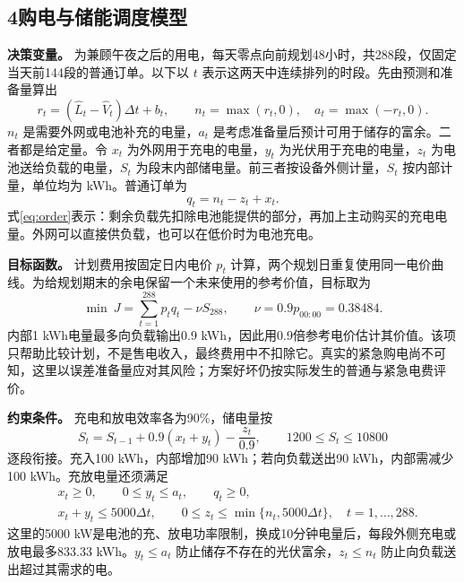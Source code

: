 \subsection*{4\quad 购电与储能调度模型}

\textbf{决策变量。} 为兼顾午夜之后的用电，每天零点向前规划48小时，共288段，仅固定当天前144段的普通订单。以下以 $t$ 表示这两天中连续排列的时段。先由预测和准备量算出
\begin{equation}
r_t=(\widehat L_t-\widehat V_t)\Delta t+b_t,\qquad
n_t=\max(r_t,0),\quad a_t=\max(-r_t,0).
\end{equation}
$n_t$ 是需要外网或电池补充的电量，$a_t$ 是考虑准备量后预计可用于储存的富余。二者都是给定量。令 $x_t$ 为外网用于充电的电量，$y_t$ 为光伏用于充电的电量，$z_t$ 为电池送给负载的电量，$S_t$ 为段末内部储电量。前三者按设备外侧计量，$S_t$ 按内部计量，单位均为 kWh。普通订单为
\begin{equation}
q_t=n_t-z_t+x_t.
\label{eq:order}
\end{equation}
式\eqref{eq:order}表示：剩余负载先扣除电池能提供的部分，再加上主动购买的充电电量。外网可以直接供负载，也可以在低价时为电池充电。

\textbf{目标函数。} 计划费用按固定日内电价 $p_t$ 计算，两个规划日重复使用同一电价曲线。为给规划期末的余电保留一个未来使用的参考价值，目标取为
\begin{equation}
\min\ J=\sum_{t=1}^{288}p_tq_t-\nu S_{288},\qquad
\nu=0.9p_{00:00}=0.38484.
\label{eq:objective}
\end{equation}
内部1 kWh电量最多向负载输出0.9 kWh，因此用0.9倍参考电价估计其价值。该项只帮助比较计划，不是售电收入，最终费用中不扣除它。真实的紧急购电尚不可知，这里以误差准备量应对其风险；方案好坏仍按实际发生的普通与紧急电费评价。

\textbf{约束条件。} 充电和放电效率各为90\%，储电量按
\begin{equation}
S_t=S_{t-1}+0.9(x_t+y_t)-\frac{z_t}{0.9},\qquad
1200\le S_t\le10800
\label{eq:storage}
\end{equation}
逐段衔接。充入100 kWh，内部增加90 kWh；若向负载送出90 kWh，内部需减少100 kWh。充放电量还须满足
\begin{equation}
\begin{aligned}
&x_t\ge0,\qquad 0\le y_t\le a_t,\qquad q_t\ge0,\\
&x_t+y_t\le5000\Delta t,\qquad
0\le z_t\le\min\{n_t,5000\Delta t\},\quad t=1,\ldots,288.
\end{aligned}
\label{eq:bounds}
\end{equation}
这里的5000 kW是电池的充、放电功率限制，换成10分钟电量后，每段外侧充电或放电最多833.33 kWh。$y_t\le a_t$ 防止储存不存在的光伏富余，$z_t\le n_t$ 防止向负载送出超过其需求的电。

